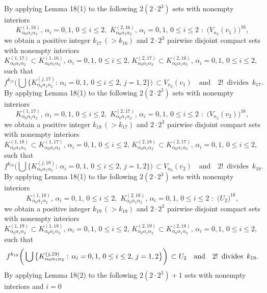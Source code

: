 \documentclass[12pt]{article}
\newcommand{\al}{\alpha}
\begin{document}
By applying Lemma 18(1) to the following $2(2 \cdot 2^3)$ sets with nonempty interiors 
$$
K_{\al_0\al_1\al_2}^{(1,16)}, \, \al_i = 0, 1, \, 0 \le i \le 2, \,\, K_{\al_0\al_1\al_2}^{(2,16)}, \, \al_i = 0, 1, \, 0 \le i \le 2 \,\, : \,\, \big(V_{n_2}(v_1)\big)^{16},
$$
we obtain a positive integer $k_{17} \, (> k_{16})$ and $2 \cdot 2^3$ pairwise disjoint compact sets with nonempty interiors $K_{\al_0\al_1\al_2}^{(1,17)} \subset K_{\al_0\al_1\al_2}^{(1,16)}, \, \al_i = 0, 1, \, 0 \le i \le 2, \, K_{\al_0\al_1\al_2}^{(2,17)} \subset K_{\al_0\al_1\al_2}^{(2,16)}, \, \al_i = 0, 1, \, 0 \le i \le 2$, such that 
$$
f^{k_{17}}\bigg(\bigcup \big\{ K_{\al_0\al_1\al_2}^{(j,17)}: \, \al_i = 0, 1, \, 0 \le i \le 2, \, j = 1, 2 \big\}\bigg) \, \subset V_{n_2}(v_1)  \quad \text{and} \quad 2! \,\,\, \text{divides} \,\,\, k_{17}.
$$
\indent By applying Lemma 18(1) to the following $2(2 \cdot 2^3)$ sets with nonempty interiors 
$$
K_{\al_0\al_1\al_2}^{(1,17)}, \, \al_i = 0, 1, \, 0 \le i \le 2, \,\, K_{\al_0\al_1\al_2}^{(2,17)}, \, \al_i = 0, 1, \, 0 \le i \le 2 \,\, : \,\, \big(V_{n_2}(v_2)\big)^{16},
$$
we obtain a positive integer $k_{18} \, (> k_{17})$ and $2 \cdot 2^3$ pairwise disjoint compact sets with nonempty interiors $K_{\al_0\al_1\al_2}^{(1,18)} \subset K_{\al_0\al_1\al_2}^{(1,17)}, \, \al_i = 0, 1, \, 0 \le i \le 2, \, K_{\al_0\al_1\al_2}^{(2,18)} \subset K_{\al_0\al_1\al_2}^{(2,17)}, \, \al_i = 0, 1, \, 0 \le i \le 2$, such that 
$$
f^{k_{18}}\bigg(\bigcup \big\{ K_{\al_0\al_1\al_2}^{(j,18)}: \, \al_i = 0, 1, \, 0 \le i \le 2, \, j = 1, 2 \big\}\bigg) \, \subset V_{n_2}(v_2) \quad \text{and} \quad 2! \,\,\, \text{divides} \,\,\, k_{18}.
$$
\indent By applying Lemma 18(1) to the following $2(2 \cdot 2^3)$ sets with nonempty interiors 
$$
K_{\al_0\al_1\al_2}^{(1,18)}, \, \al_i = 0, 1, \, 0 \le i \le 2, \,\, K_{\al_0\al_1\al_2}^{(2,18)}, \, \al_i = 0, 1, \, 0 \le i \le 2 \,\, : \,\, \big(U_2\big)^{16},
$$
we obtain a positive integer $k_{19} \, (> k_{18})$ and $2 \cdot 2^3$ pairwise disjoint compact sets with nonempty interiors $K_{\al_0\al_1\al_2}^{(1,19)} \subset K_{\al_0\al_1\al_2}^{(1,18)}, \, \al_i = 0, 1, \, 0 \le i \le 2, \, K_{\al_0\al_1\al_2}^{(2,19)} \subset K_{\al_0\al_1\al_2}^{(2,18)}, \, \al_i = 0, 1, \, 0 \le i \le 2$, such that 
$$
f^{k_{19}}\bigg(\bigcup \big\{ K_{\al_0\al_1\al_2}^{(j,19)}: \, \al_i = 0, 1, \, 0 \le i \le 2, \, j = 1, 2 \big\}\bigg) \, \subset U_2 \quad \text{and} \quad 2! \,\,\, \text{divides} \,\,\, k_{19}. \vspace{.1in}
$$
\indent By applying Lemma 18(2) to the following $2(2 \cdot 2^3)+1$ sets with nonempty interiors and $i = 0$
\end{document}
